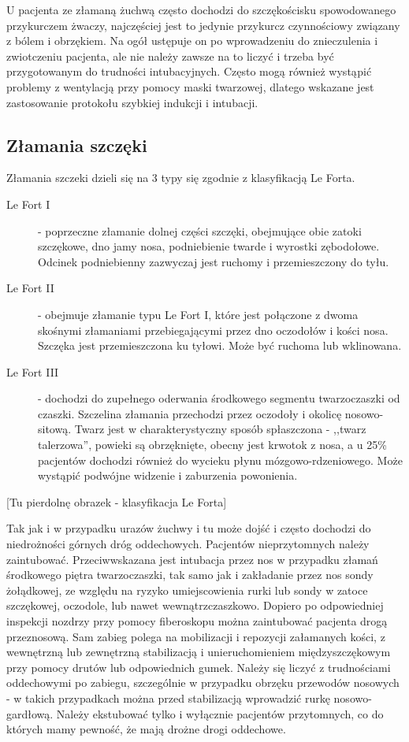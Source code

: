 \documentclass[a4paper, 12pt]{report}
\begin{document}
U pacjenta ze złamaną żuchwą często dochodzi do szczękościsku
spowodowanego przykurczem żwaczy, najczęściej jest to jedynie
przykurcz czynnościowy związany z bólem i obrzękiem. Na ogół ustępuje
on po wprowadzeniu do znieczulenia i zwiotczeniu pacjenta, ale nie
należy zawsze na to liczyć i trzeba być przygotowanym do trudności
intubacyjnych. Często mogą również wystąpić problemy z wentylacją przy
pomocy maski twarzowej, dlatego wskazane jest zastosowanie protokołu
szybkiej indukcji i intubacji.

\subsection{Złamania szczęki}

Złamania szczeki dzieli się na 3 typy się zgodnie z klasyfikacją Le
Forta.
\begin{description}
\item [Le Fort I] - poprzeczne złamanie dolnej części szczęki,
  obejmujące obie zatoki szczękowe, dno jamy nosa, podniebienie twarde
  i wyrostki zębodołowe. Odcinek podniebienny zazwyczaj jest ruchomy i
  przemieszczony do tyłu.
\item [Le Fort II] - obejmuje złamanie typu Le Fort I, które jest
  połączone z dwoma skośnymi złamaniami przebiegającymi przez dno
  oczodołów i kości nosa. Szczęka jest przemieszczona ku tyłowi. Może
  być ruchoma lub wklinowana.
\item [Le Fort III] - dochodzi do zupełnego oderwania środkowego
  segmentu twarzoczaszki od czaszki. Szczelina złamania przechodzi
  przez oczodoły i okolicę nosowo-sitową. Twarz jest w
  charakterystyczny sposób spłaszczona - ,,twarz talerzowa'', powieki
  są obrzęknięte, obecny jest krwotok z nosa, a u 25\% pacjentów
  dochodzi również do wycieku płynu mózgowo-rdzeniowego. Może wystąpić
  podwójne widzenie i zaburzenia powonienia.
\end{description}


[Tu pierdolnę obrazek - klasyfikacja Le Forta]\newline

Tak jak i w przypadku urazów żuchwy i tu może dojść i często dochodzi
do niedrożności górnych dróg oddechowych. Pacjentów nieprzytomnych
należy zaintubować. Przeciwwskazana jest intubacja przez nos w
przypadku złamań środkowego piętra twarzoczaszki, tak samo jak i
zakładanie przez nos sondy żołądkowej, ze względu na ryzyko
umiejscowienia rurki lub sondy w zatoce szczękowej, oczodole, lub
nawet wewnątrzczaszkowo. Dopiero po odpowiedniej inspekcji nozdrzy
przy pomocy fiberoskopu można zaintubować pacjenta drogą przeznosową.
Sam zabieg polega na mobilizacji i repozycji załamanych kości, z
wewnętrzną lub zewnętrzną stabilizacją i unieruchomieniem
międzyszczękowym przy pomocy drutów lub odpowiednich gumek. Należy się
liczyć z trudnościami oddechowymi po zabiegu, szczególnie w przypadku
obrzęku przewodów nosowych - w takich przypadkach można przed
stabilizacją wprowadzić rurkę nosowo-gardłową. Należy ekstubować tylko
i wyłącznie pacjentów przytomnych, co do których mamy pewność, że mają
drożne drogi oddechowe.
\end{document}
